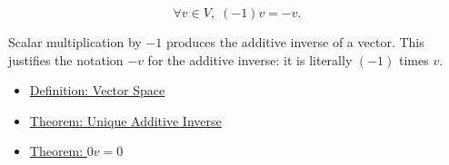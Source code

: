 \begin{remark*}
\[
\forall v \in V,\; (-1)v=-v.
\]
\end{remark*}

\begin{remark*}[Interpretation]
Scalar multiplication by $-1$ produces the additive inverse of a vector.
This justifies the notation $-v$ for the additive inverse: it is literally
$(-1)$ times $v$.
\end{remark*}

\begin{remark*}[Dependencies]
\begin{itemize}
  \item \hyperref[def:vector-space]{Definition: Vector Space}
  \item \hyperref[thm:unique-additive-inverse]{Theorem: Unique Additive Inverse}
  \item \hyperref[thm:zero-scalar-times-vector]{Theorem: $0v=0$}
\end{itemize}
\end{remark*}
